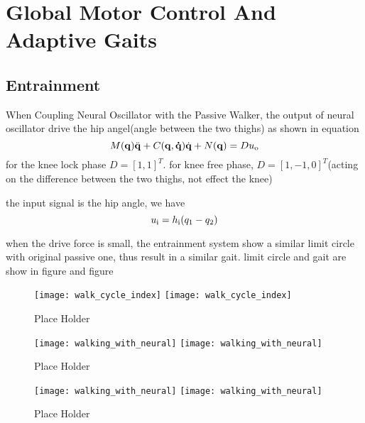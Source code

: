 \section{Global Motor Control And Adaptive Gaits}

\subsection{Entrainment}

When Coupling Neural Oscillator with the Passive Walker,
the output of neural oscillator drive the hip angel(angle between the two thighs)
as shown in equation
\begin{equation}
M(\mathbf{q}) \ddot{\mathbf{q}} + C(\mathbf{q,\dot{q}})\dot{\mathbf{q}} + N(\mathbf{q}) = Du_{\mathrm{o}}
\end{equation}
for the knee lock phase $D=[1,1]^T$.
for knee free phase, $D=[1,-1,0]^T$(acting on the difference between the two thighs, not effect the knee)

the input signal is the hip angle,
we have 
\[
	u_{\mathrm{i}}=h_{\mathrm{i}}(q_1-q_2)
\]

when the drive force is small, the entrainment system show a similar limit circle with original passive one,
thus result in a similar gait.
limit circle and gait are show in figure and figure 

\begin{figure}[!htbp]
  \begin{center}
    \leavevmode
    \ifpdf
      \texttt{[image: walk\_cycle\_index]}
    \else
      \texttt{[image: walk\_cycle\_index]}
    \fi
    \caption{Place Holder}
    \label{fig:Passive And Entraintment Walking Comparation}
\end{center}
\end{figure}

\begin{figure}[!htbp]
  \begin{center}
    \leavevmode
    \ifpdf
      \texttt{[image: walking\_with\_neural]}
    \else
      \texttt{[image: walking\_with\_neural]}
    \fi
    \caption{Place Holder}
    \label{fig:passivegait}
\end{center}
\end{figure}

\begin{figure}[!htbp]
  \begin{center}
    \leavevmode
    \ifpdf
      \texttt{[image: walking\_with\_neural]}
    \else
      \texttt{[image: walking\_with\_neural]}
    \fi
    \caption{Place Holder}
    \label{fig:entrainmentgait}
\end{center}
\end{figure}



